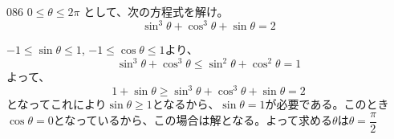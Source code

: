 \begin{prob}{086}{}{}
 $0 \le \theta \le 2\pi$ として、次の方程式を解け。 \\
 \[ \sin^3\theta+\cos^3\theta+\sin\theta=2 \]
\end{prob}

$-1\le\sin\theta\le 1$, $-1\le\cos\theta\le 1$より、
\[ \sin^3\theta+\cos^3\theta\le\sin^2\theta+\cos^2\theta=1 \]
よって、
\[ 1+\sin\theta \ge \sin^3\theta+\cos^3\theta+\sin\theta=2 \]
となってこれにより$\sin\theta\ge 1$となるから、$\sin\theta=1$が必要である。このとき$\cos\theta=0$となっているから、この場合は解となる。よって求める$\theta$は$\theta=\dfrac{\pi}{2}$